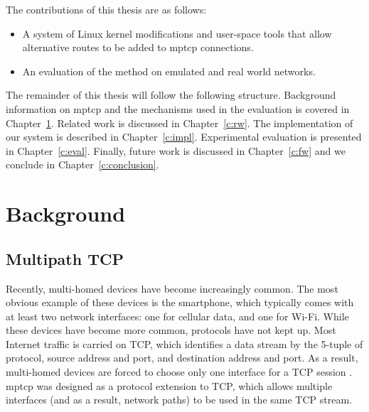 \documentclass{cwru}
\begin{document}
The contributions of this thesis are as follows:
\begin{itemize}
\item A system of Linux kernel modifications and user-space tools that allow
  alternative routes to be added to \ac{mptcp} connections.
\item An evaluation of the method on emulated and real world networks.
\end{itemize}

The remainder of this thesis will follow the following structure. Background
information on \ac{mptcp} and the mechanisms used in the evaluation is covered
in Chapter~\ref{c:bg}. Related work is discussed in Chapter~\ref{c:rw}. The
implementation of our system is described in Chapter~\ref{c:impl}. Experimental
evaluation is presented in Chapter~\ref{c:eval}. Finally, future work is
discussed in Chapter~\ref{c:fw} and we conclude in Chapter~\ref{c:conclusion}.

\chapter{Background}
\label{c:bg}

\section{Multipath TCP}

Recently, multi-homed devices have become increasingly common. The most obvious
example of these devices is the smartphone, which typically comes with at least
two network interfaces: one for cellular data, and one for Wi-Fi. While these
devices have become more common, protocols have not kept up. Most Internet
traffic is carried on TCP, which identifies a data stream by the 5-tuple of
protocol, source address and port, and destination address and port. As a
result, multi-homed devices are forced to choose only one interface for a TCP
session \cite{raiciu2012hard}. \ac{mptcp} was designed as a protocol extension
to TCP, which allows multiple interfaces (and as a result, network paths) to be
used in the same TCP stream.
\end{document}
